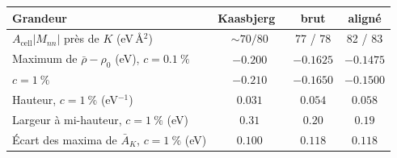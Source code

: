 \begin{tabular}{l c c c}
    \hline\hline
    Grandeur & Kaasbjerg~\cite{kaasbjergAtomisticMatrixTheory2020} & brut & aligné \\
    \hline
    $A_\text{cell}|M_{nn}|$ près de $K$ (eV\,\AA$^2$) & ${\sim}70/80$ & 77 / 78   & 82 / 83 \\
    Maximum de $\bar\rho-\rho_0$ (eV), $c = 0.1~\%$   & $-0.200$   & $-0.1625$ & $-0.1475$ \\
    \quad $c = 1~\%$                                  & $-0.210$   & $-0.1650$ & $-0.1500$ \\
    Hauteur, $c = 1~\%$ (eV$^{-1}$)                   & $0.031$    & $0.054$   & $0.058$ \\
    Largeur à mi-hauteur, $c = 1~\%$ (eV)             & $0.31$     & $0.20$    & $0.19$ \\
    Écart des maxima de $\bar A_K$, $c = 1~\%$ (eV)   & $0.100$    & $0.118$   & $0.118$ \\
    \hline\hline
\end{tabular}

